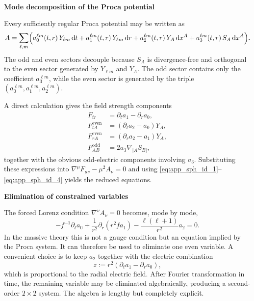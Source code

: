 \documentclass[12pt]{article}
\numberwithin{equation}{section}
\theoremstyle{plain}
\theoremstyle{definition}
\theoremstyle{remark}
\newcommand{\dd}{\mathrm d}
\newcommand{\appheading}[1]{\par\medskip\noindent\textbf{#1}\par\smallskip\noindent}
\begin{document}
\appheading{Mode decomposition of the Proca potential}

Every sufficiently regular Proca potential may be written as
\begin{equation}\label{eq:app_mode_decomp}
   A
   =
   \sum_{\ell,m}
   \Bigl(
      a_0^{\ell m}(t,r)\,Y_{\ell m}\,\dd t
      +
      a_1^{\ell m}(t,r)\,Y_{\ell m}\,\dd r
      +
      a_2^{\ell m}(t,r)\,Y_A\,\dd x^A
      +
      a_3^{\ell m}(t,r)\,S_A\,\dd x^A
   \Bigr).
\end{equation}
The odd and even sectors decouple because $S_A$ is divergence-free and orthogonal to the even sector generated by $Y_{\ell m}$ and $Y_A$.  The odd sector contains only the coefficient $a_3^{\ell m}$, while the even sector is generated by the triple $(a_0^{\ell m},a_1^{\ell m},a_2^{\ell m})$.

A direct calculation gives the field strength components
\begin{align}
   F_{tr}&=\partial_t a_1-\partial_r a_0,\label{eq:app_field_strength_1}\\
   F_{tA}^{\mathrm{even}}&=(\partial_t a_2-a_0)Y_A,\label{eq:app_field_strength_2}\\
   F_{rA}^{\mathrm{even}}&=(\partial_r a_2-a_1)Y_A,\label{eq:app_field_strength_3}\\
   F_{AB}^{\mathrm{odd}}&=2a_3\nabla_{[A}S_{B]},\label{eq:app_field_strength_4}
\end{align}
together with the obvious odd-electric components involving $a_3$.  Substituting these expressions into $\nabla^\mu F_{\mu\nu}-\mu^2A_\nu=0$ and using \eqref{eq:app_sph_id_1}--\eqref{eq:app_sph_id_4} yields the reduced equations.

\appheading{Elimination of constrained variables}

The forced Lorenz condition $\nabla^\nu A_\nu=0$ becomes, mode by mode,
\begin{equation}\label{eq:app_lorenz_constraint}
   -f^{-1}\partial_t a_0+\frac{1}{r^2}\partial_r(r^2fa_1)-\frac{\ell(\ell+1)}{r^2}a_2=0.
\end{equation}
In the massive theory this is not a gauge condition but an equation implied by the Proca system.  It can therefore be used to eliminate one even variable.  A convenient choice is to keep $a_2$ together with the electric combination
\[
   z:=r^2(\partial_t a_1-\partial_r a_0),
\]
which is proportional to the radial electric field.  After Fourier transformation in time, the remaining variable may be eliminated algebraically, producing a second-order $2\times2$ system.  The algebra is lengthy but completely explicit.
\end{document}
